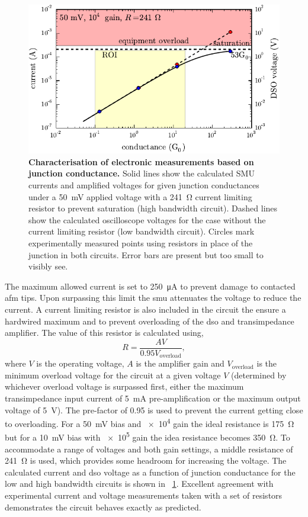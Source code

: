 \documentclass{article}
\begin{document}
\begin{figure}[bt]
\centering
\includegraphics{figures/hb_electronics_limits}
\caption[Characterisation of electronic measurements based on junction conductance.]{\textbf{Characterisation of electronic measurements based on junction conductance.} Solid lines show the calculated SMU currents and amplified voltages for given junction conductances under a \SI{50}{mV} applied voltage with a \SI{241}{\ohm} current limiting resistor to prevent saturation (high bandwidth circuit). Dashed lines show the calculated oscilloscope voltages for the case without the current limiting resistor (low bandwidth circuit). Circles mark experimentally measured points using resistors in place of the junction in both circuits. Error bars are present but too small to visibly see.}
\label{fig:hb_electronics_limits}
\end{figure}

The maximum allowed current is set to \SI{250}{\micro\ampere} to prevent damage to contacted \gls{afm} tips. Upon surpassing this limit the \gls{smu} attenuates the voltage to reduce the current. A current limiting resistor is also included in the circuit the ensure a hardwired maximum and to prevent overloading of the \gls{dso} and transimpedance amplifier. The value of this resistor is calculated using,
\begin{equation}
R = \frac{AV}{0.95V_{\mathrm{overload}}},
\end{equation}
where $V$ is the operating voltage, $A$ is the amplifier gain and $V_{\mathrm{overload}}$ is the minimum overload voltage for the circuit at a given voltage $V$ (determined by whichever overload voltage is surpassed first, either the maximum transimpedance input current of \SI{5}{mA} pre-amplification or the maximum output voltage of \SI{5}{V}). The pre-factor of 0.95 is used to prevent the current getting close to overloading. For a \SI{50}{mV} bias and \num{e4} gain the ideal resistance is \SI{175}{\ohm} but for a \SI{10}{mV} bias with \num{e5} gain the idea resistance becomes \SI{350}{\ohm}. To accommodate a range of voltages and both gain settings, a middle resistance of \SI{241}{\ohm} is used, which provides some headroom for increasing the voltage. The calculated current and \gls{dso} voltage as a function of junction conductance for the low and high bandwidth circuits is shown in \figurename~\ref{fig:hb_electronics_limits}. Excellent agreement with experimental current and voltage measurements taken with a set of resistors demonstrates the circuit behaves exactly as predicted.
\end{document}
